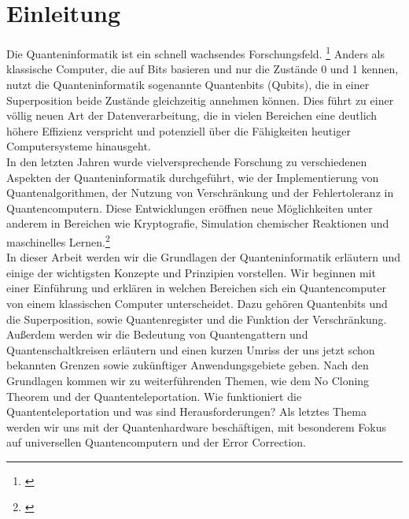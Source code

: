 \section{Einleitung}
\label{sec:einleitung}

Die Quanteninformatik ist ein schnell wachsendes Forschungsfeld. \footnote{\cite[S. XII.]{homeister_quantum_2022}}
Anders als klassische Computer, die auf Bits basieren und nur die Zustände 0 und 1 kennen, nutzt die Quanteninformatik sogenannte Quantenbits (Qubits), die in einer Superposition beide Zustände gleichzeitig annehmen können.
Dies führt zu einer völlig neuen Art der Datenverarbeitung, die in vielen Bereichen eine deutlich höhere Effizienz verspricht und potenziell über die Fähigkeiten heutiger Computersysteme hinausgeht.\\

In den letzten Jahren wurde vielversprechende Forschung zu verschiedenen Aspekten der Quanteninformatik durchgeführt, wie der Implementierung von Quantenalgorithmen, der Nutzung von Verschränkung und der Fehlertoleranz in Quantencomputern.
Diese Entwicklungen eröffnen neue Möglichkeiten unter anderem in Bereichen wie Kryptografie, Simulation chemischer Reaktionen und maschinelles Lernen.\footnote{\cite{Fraunhofer_quantencomputing_2025}}\\

In dieser Arbeit werden wir die Grundlagen der Quanteninformatik erläutern und einige der wichtigsten Konzepte und Prinzipien vorstellen.
Wir beginnen mit einer Einführung und erklären in welchen Bereichen sich ein Quantencomputer von einem klassischen Computer unterscheidet.
Dazu gehören Quantenbits und die Superposition, sowie Quantenregister und die Funktion der Verschränkung.
Außerdem werden wir die Bedeutung von Quantengattern und Quantenschaltkreisen erläutern und einen kurzen Umriss der uns jetzt schon bekannten Grenzen sowie zukünftiger Anwendungsgebiete geben.
Nach den Grundlagen kommen wir zu weiterführenden Themen, wie dem No Cloning Theorem und der Quantenteleportation.
Wie funktioniert die Quantenteleportation und was sind Herausforderungen?
Als letztes Thema werden wir uns mit der Quantenhardware beschäftigen, mit besonderem Fokus auf universellen Quantencomputern und der Error Correction.
